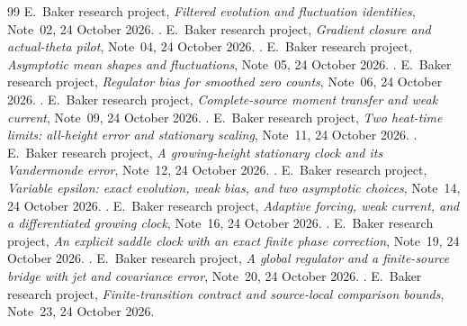 \begin{thebibliography}{99}
E.~Baker research project, \emph{Filtered evolution and fluctuation
identities}, Note~02, 24 October 2026.
.
E.~Baker research project, \emph{Gradient closure and actual-theta pilot},
Note~04, 24 October 2026.
.
E.~Baker research project, \emph{Asymptotic mean shapes and fluctuations},
Note~05, 24 October 2026.
.
E.~Baker research project, \emph{Regulator bias for smoothed zero counts},
Note~06, 24 October 2026.
.
E.~Baker research project, \emph{Complete-source moment transfer and weak
current}, Note~09, 24 October 2026.
.
E.~Baker research project, \emph{Two heat-time limits: all-height error and
stationary scaling}, Note~11, 24 October 2026.
.
E.~Baker research project, \emph{A growing-height stationary clock and its
Vandermonde error}, Note~12, 24 October 2026.
.
E.~Baker research project, \emph{Variable epsilon: exact evolution, weak
bias, and two asymptotic choices}, Note~14, 24 October 2026.
.
E.~Baker research project, \emph{Adaptive forcing, weak current, and a
differentiated growing clock}, Note~16, 24 October 2026.
.
E.~Baker research project, \emph{An explicit saddle clock with an exact
finite phase correction}, Note~19, 24 October 2026.
.
E.~Baker research project, \emph{A global regulator and a finite-source
bridge with jet and covariance error}, Note~20, 24 October 2026.
.
E.~Baker research project, \emph{Finite-transition contract and source-local
comparison bounds}, Note~23, 24 October 2026.

\end{thebibliography}
